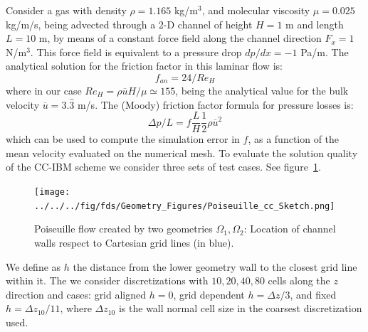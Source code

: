 \documentclass[11pt]{book}
\begin{document}
\label{sec:poiseuille_cc}

Consider a gas with density $\rho=1.165$ kg/m$^3$, and molecular viscosity $\mu=0.025$ kg/m/s, being advected through a 2-D channel of height $H=1$ m and length $L=10$ m, by means of a constant force field along the channel direction $F_x=1$ N/m$^3$. This force field is equivalent to a pressure drop $dp/dx=-1$ Pa/m. The analytical solution for the friction factor in this laminar flow is:
%
\begin{equation}
   f_{an} = 24/Re_H
\end{equation}
%
where in our case $Re_H= \rho \overline{u} H/ \mu \simeq 155$, being the analytical value for the bulk velocity $\overline{u}=3.\hat{3}$ m/s. The (Moody) friction factor formula for pressure losses is:
%
\begin{equation}
   \Delta p / L = f \frac{L}{H}  \frac{1}{2} \rho \overline{u}^2
\end{equation}
%
which can be used to compute the simulation error in $f$, as a function of the mean velocity evaluated on the numerical mesh. To evaluate the solution quality of the CC-IBM scheme we consider three sets of test cases. See figure~\ref{Fig:PoiseSketch}.
%
\begin{figure}[h]
      \centering
      \texttt{[image: ../../../fig/fds/Geometry\_Figures/Poiseuille\_cc\_Sketch.png]}
      \caption{Poiseuille flow created by two geometries $\Omega_1, \Omega_2$: Location of channel walls respect to Cartesian grid lines (in blue).}
	\label{Fig:PoiseSketch}
\end{figure}
%
We define as $h$ the distance from the lower geometry wall to the closest grid line within it. The we consider discretizations with ${10,20,40,80}$ cells along the $z$ direction and cases: grid aligned $h=0$, grid dependent $h=\Delta z /3$, and fixed $h=\Delta z_{10}/11$, where $\Delta z_{10}$ is the wall normal cell size in the coarsest discretization used.
\end{document}
